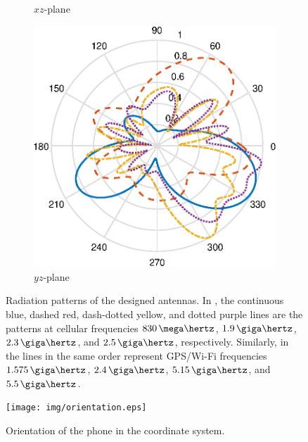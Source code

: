 \begin{figure}[H]
\begin{subfigure}[b]{0.26\textwidth}
        \caption{$xz$-plane}
        \label{fig:ff_xz_gpswifi}
    \end{subfigure}
    \begin{subfigure}[b]{0.26\textwidth}
        \includegraphics[width=\textwidth]{img/ff_gpswifi_yz.eps}
        \caption{$yz$-plane}
        \label{fig:ff_yz_gpswifi}
    \end{subfigure}
    \vspace{-5pt}
    \caption{Radiation patterns of the designed antennas. In , the continuous blue, dashed red, dash-dotted yellow, and dotted purple lines are the patterns at cellular frequencies $830\,\mega\hertz$, $1.9\,\giga\hertz$, $2.3\,\giga\hertz$, and $2.5\,\giga\hertz$, respectively. Similarly, in  the lines in the same order represent GPS/Wi-Fi frequencies $1.575\,\giga\hertz$, $2.4\,\giga\hertz$, $5.15\,\giga\hertz$, and $5.5\,\giga\hertz$. }
    \label{fig:rad_patterns}
    \vspace{-10pt}
\end{figure}

\begin{figure}[H]
    \centering
    \texttt{[image: img/orientation.eps]}
    \caption{Orientation of the phone in the coordinate system.}
    \label{fig:orientation}
\end{figure}

